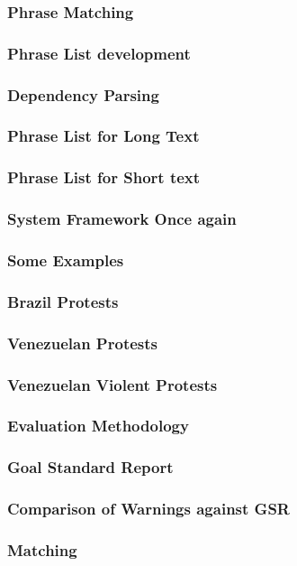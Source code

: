 \documentclass{beamer}
\begin{document}
\begin{frame}
\frametitle{Phrase Matching}
\end{frame}


\begin{frame}
\frametitle{Phrase List development}
\end{frame}


\begin{frame}
    \frametitle{Dependency Parsing}
\end{frame}


\begin{frame}
    \frametitle{Phrase List for Long Text}
\end{frame}


\begin{frame}
    \frametitle{Phrase List for Short text}
\end{frame}


\begin{frame}
    \frametitle{System Framework Once again}
\end{frame}

\begin{frame}
    \frametitle{Some Examples}
\end{frame}

\begin{frame}
    \frametitle{Brazil Protests}
\end{frame}

\begin{frame}
    \frametitle{Venezuelan Protests}
\end{frame}

\begin{frame}
    \frametitle{Venezuelan Violent Protests}
\end{frame}

\begin{frame}
    \frametitle{Evaluation Methodology}
\end{frame}


\begin{frame}
    \frametitle{Goal Standard Report}
\end{frame}


\begin{frame}
    \frametitle{Comparison of Warnings against GSR}
\end{frame}


\begin{frame}
    \frametitle{Matching}
\end{frame}
\end{document}
